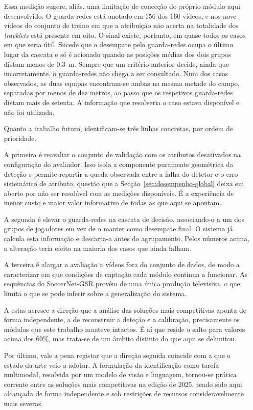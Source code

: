 Essa medição sugere, aliás, uma limitação de conceção do próprio módulo aqui desenvolvido. O guarda-redes está anotado em $156$ dos $160$ vídeos, e nos nove vídeos do conjunto de treino em que a atribuição não acerta na totalidade dos \emph{tracklets} está presente em oito. O sinal existe, portanto, em quase todos os casos em que seria útil. Sucede que o desempate pelo guarda-redes ocupa o último lugar da cascata e só é acionado quando as posições médias dos dois grupos distam menos de $0.3$~m. Sempre que um critério anterior decide, ainda que incorretamente, o guarda-redes não chega a ser consultado. Num dos casos observados, as duas equipas encontram-se ambas na mesma metade do campo, separadas por menos de dez metros, ao passo que os respetivos guarda-redes distam mais de setenta. A informação que resolveria o caso estava disponível e não foi utilizada.

Quanto a trabalho futuro, identificam-se três linhas concretas, por ordem de prioridade.

A primeira é reavaliar o conjunto de validação com os atributos desativados na configuração do avaliador. Isso isola a componente puramente geométrica da deteção e permite repartir a queda observada entre a falha do detetor e o erro sistemático de atributo, questão que a Secção~\ref{sec:desempenho-global} deixa em aberto por não ser resolúvel com as medições disponíveis. É a experiência de menor custo e maior valor informativo de todas as que aqui se apontam.

A segunda é elevar o guarda-redes na cascata de decisão, associando-o a um dos grupos de jogadores em vez de o manter como desempate final. O sistema já calcula esta informação e descarta-a antes do agrupamento. Pelos números acima, a alteração teria efeito na maioria dos casos que ainda falham.

A terceira é alargar a avaliação a vídeos fora do conjunto de dados, de modo a caracterizar em que condições de captação cada módulo continua a funcionar. As sequências do SoccerNet-GSR provêm de uma única produção televisiva, o que limita o que se pode inferir sobre a generalização do sistema.

A estas acresce a direção que a análise das soluções mais competitivas aponta de forma independente, a de reconstruir a deteção e a calibração, precisamente os módulos que este trabalho manteve intactos. É aí que reside o salto para valores acima dos $60\%$, mas trata-se de um âmbito distinto do que aqui se delimitou.

Por último, vale a pena registar que a direção seguida coincide com a que o estado da arte veio a adotar. A formulação da identificação como tarefa multimodal, resolvida por um modelo de visão e linguagem, tornou-se prática corrente entre as soluções mais competitivas na edição de 2025, tendo sido aqui alcançada de forma independente e sob restrições de recursos consideravelmente mais severas.
